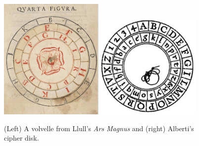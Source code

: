 \begin{figure}[t]
    \centering

    \includegraphics[width=0.45\textwidth]{2_Related_Work/images/llull_volvelle.png}\hfill
    \includegraphics[width=0.45\textwidth]{2_Related_Work/images/alberti_cipher_disk.jpg}

\caption{(Left) A volvelle from  Llull's \textit{Ars Magnus} and (right)
Alberti's cipher disk.}
\label{fig:llull_volvelle}
\end{figure}
